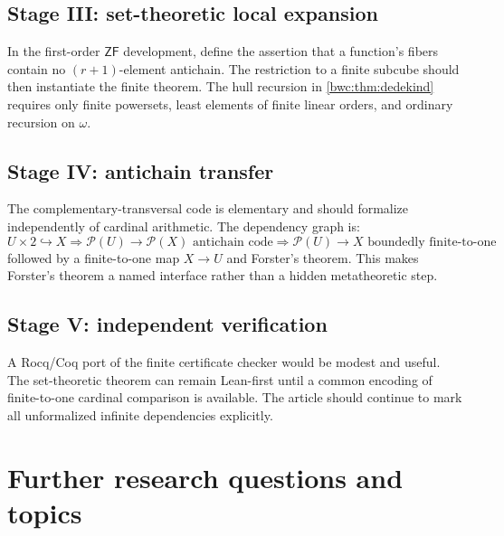 \documentclass[11pt,letterpaper]{article}
\numberwithin{equation}{section}
\theoremstyle{plain}
\theoremstyle{definition}
\theoremstyle{remark}
\newcommand{\Pow}{\mathcal P}
\newcommand{\ZF}{\mathsf{ZF}}
\begin{document}
\subsection{Stage III: set-theoretic local expansion}
In the first-order $\ZF$ development, define the assertion that a function's
fibers contain no $(r+1)$-element antichain.  The restriction to a finite
subcube should then instantiate the finite theorem.  The hull recursion in
\cref{bwc:thm:dedekind} requires only finite powersets, least elements of finite
linear orders, and ordinary recursion on $\omega$.

\subsection{Stage IV: antichain transfer}
The complementary-transversal code is elementary and should formalize
independently of cardinal arithmetic.  The dependency graph is:
\[
\boxed{U\times2\hookrightarrow X}
\Longrightarrow
\boxed{\Pow(U)\to\Pow(X)\text{ antichain code}}
\Longrightarrow
\boxed{\Pow(U)\to X\text{ boundedly finite-to-one}}
\]
followed by a finite-to-one map $X\to U$ and Forster's theorem.  This makes
Forster's theorem a named interface rather than a hidden metatheoretic step.

\subsection{Stage V: independent verification}
A Rocq/Coq port of the finite certificate checker would be modest and useful.
The set-theoretic theorem can remain Lean-first until a common encoding of
finite-to-one cardinal comparison is available.  The article should continue
to mark all unformalized infinite dependencies explicitly.

\section{Further research questions and topics}\label{bwc:sec:questions}
\end{document}

